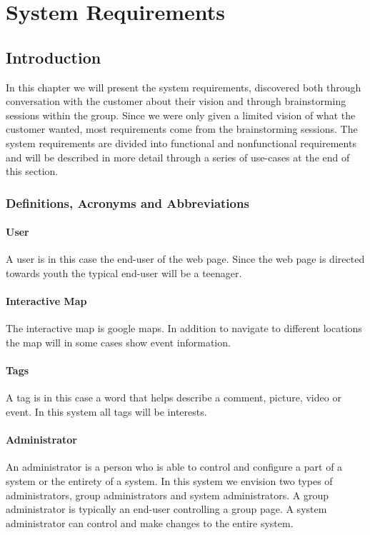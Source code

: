 \chapter{System Requirements}
\label{chap:SysReq}

\section{Introduction}
\label{sec:SysReqIntro}
In this chapter we will present the system requirements, discovered both through conversation with the customer about their vision and through brainstorming sessions within the group. Since we were only given a limited vision of what the customer wanted, most requirements come from the brainstorming sessions. The system requirements are divided into functional and nonfunctional requirements and will be described in more detail through a series of use-cases at the end of this section.

\subsection{Definitions, Acronyms and Abbreviations}
\label{subsec:SysIntroReqDefs}

\subsubsection*{User}
A user is in this case the end-user of the web page. Since the web page is directed towards youth the typical end-user will be a teenager. 

\subsubsection*{Interactive Map}
The interactive map is google maps. In addition to navigate to different locations the map will in some cases show event information.

\subsubsection*{Tags}
A tag is in this case a word that helps describe a comment, picture, video or event. In this system all tags will be interests. 

\subsubsection*{Administrator}
An administrator is a person who is able to control and configure a part of a system or the entirety  of a system. In this system we envision two types of administrators, group administrators and system administrators. A group administrator is typically an end-user controlling a group page. A system administrator can control and make changes to the entire system.

